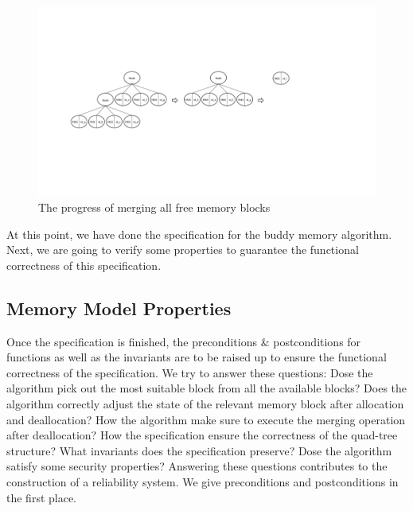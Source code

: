 \documentclass[runningheads]{llncs}
\begin{document}
\begin{figure}
\centering
\includegraphics[width=1\textwidth]{fig2.pdf}
\caption{The progress of merging all free memory blocks}
\label{fig2}
\end{figure}

At this point, we have done the specification for the buddy memory algorithm. Next, we are going to verify some properties to guarantee the functional correctness of this specification.


\subsection{Memory Model Properties}
Once the specification is finished, the preconditions $\&$ postconditions for functions as well as the invariants are to be raised up to ensure the functional correctness of the specification. We try to answer these questions: Dose the algorithm pick out the most suitable block from all the available blocks? Does the algorithm correctly adjust the state of the relevant memory block after allocation and deallocation? How the algorithm make sure to execute the merging operation after deallocation? How the specification ensure the correctness of the quad-tree structure? What invariants does the specification preserve? Dose the algorithm satisfy some security properties? Answering these questions contributes to the construction of a reliability system. We give preconditions and postconditions in the first place.
\end{document}

